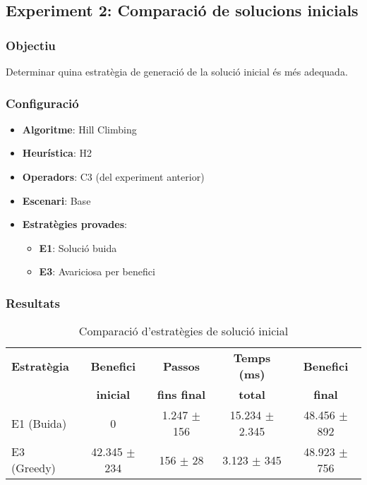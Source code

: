\subsection{Experiment 2: Comparació de solucions inicials}

\subsubsection{Objectiu}
Determinar quina estratègia de generació de la solució inicial és més adequada.

\subsubsection{Configuració}
\begin{itemize}
    \item \textbf{Algoritme}: Hill Climbing
    \item \textbf{Heurística}: H2
    \item \textbf{Operadors}: C3 (del experiment anterior)
    \item \textbf{Escenari}: Base
    \item \textbf{Estratègies provades}:
    \begin{itemize}
        \item \textbf{E1}: Solució buida
        \item \textbf{E3}: Avariciosa per benefici
    \end{itemize}
\end{itemize}

\subsubsection{Resultats}

\begin{table}[H]
\centering
\begin{tabular}{@{}lcccc@{}}
\toprule
\textbf{Estratègia} & \textbf{Benefici} & \textbf{Passos} & \textbf{Temps (ms)} & \textbf{Benefici} \\
 & \textbf{inicial} & \textbf{fins final} & \textbf{total} & \textbf{final} \\
\midrule
E1 (Buida) & 0 & 1.247 $\pm$ 156 & 15.234 $\pm$ 2.345 & 48.456 $\pm$ 892 \\
E3 (Greedy) & 42.345 $\pm$ 234 & 156 $\pm$ 28 & 3.123 $\pm$ 345 & 48.923 $\pm$ 756 \\
\bottomrule
\end{tabular}
\caption{Comparació d'estratègies de solució inicial}
\label{tab:exp2-inicial}
\end{table}

